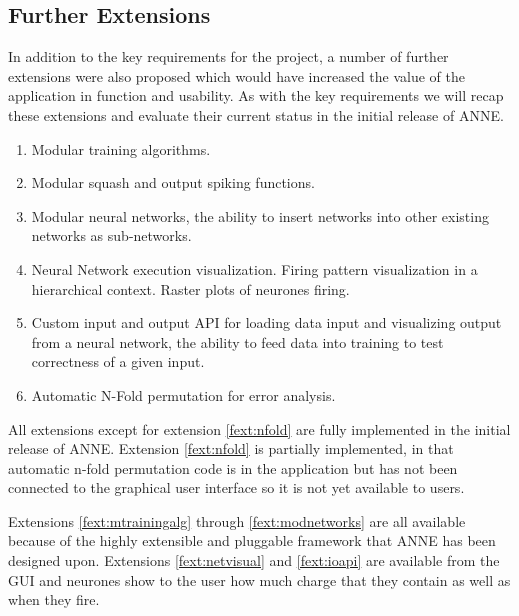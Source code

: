 \documentclass{acm_proc_article-sp}
\begin{document}
\subsection{Further Extensions}
{
In addition to the key requirements for the project, a number of further extensions were also proposed which would have increased the value of the application in function and usability. As with the key requirements we will recap these extensions and evaluate their current status in the initial release of ANNE.
\begin{enumerate}
\item{
\label{fext:mtrainingalg}
Modular training algorithms.
}
\item{
\label{fext:spikingfunc}
Modular squash and output spiking functions.
}
\item{
\label{fext:modnetworks}
Modular neural networks, the ability to insert networks into other existing networks as sub-networks.
}
\item{
\label{fext:netvisual}
Neural Network execution visualization. Firing pattern visualization in a hierarchical context. Raster plots of neurones firing.
}
\item{
\label{fext:ioapi}
Custom input and output API for loading data input and visualizing output from a neural network, the ability to feed data into training to test correctness of a given input.
}
\item{
\label{fext:nfold}
Automatic N-Fold permutation for error analysis.
}
\end{enumerate}

All extensions except for extension \ref{fext:nfold} are fully implemented in the initial release of ANNE. Extension \ref{fext:nfold} is partially implemented, in that automatic n-fold permutation code is in the application but has not been connected to the graphical user interface so it is not yet available to users.

Extensions \ref{fext:mtrainingalg} through \ref{fext:modnetworks} are all available because of the highly extensible and pluggable framework that ANNE has been designed upon. Extensions \ref{fext:netvisual} and \ref{fext:ioapi} are available from the GUI and neurones show to the user how much charge that they contain as well as when they fire.
}
\end{document}
